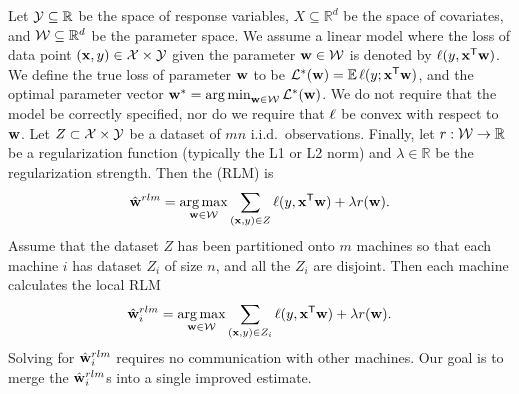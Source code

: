 \documentclass[thesis.tex]{subfiles}
\begin{document}
\vspace{-0.05in}
Let ${\mathcal Y}\subseteq\mathbb{R}$ be the space of response variables,
$X\subseteq\mathbb{R}^d$ be the space of covariates,
and ${\mathcal W}\subseteq\mathbb{R}^d$ be the parameter space.
We assume a linear model where the loss of data point $(\mathbf{x},y)\in{\mathcal X}\times{\mathcal Y}$ given the parameter $\mathbf w\in{\mathcal W}$ is denoted by $\ell(y,{\mathbf{x}}^{\mathsf{T}}\mathbf w)$.
We define the true loss of parameter $\mathbf w$ to be $\mathcal{L}^*(\mathbf w) = \operatorname*{\mathbb E}\ell(y;{\mathbf{x}}^{\mathsf{T}}\mathbf w)$, 
and the optimal parameter vector ${\mathbf w^{*}}=\operatorname*{arg\,min}_{\mathbf w\in{\mathcal W}}\mathcal{L}^*(\mathbf w)$.
We do not require that the model be correctly specified,
nor do we require that $\ell$ be convex with respect to $\mathbf w$.
Let $Z\subset{\mathcal X}\times{\mathcal Y}$ be a dataset of $mn$ i.i.d.\ observations.
Finally, let $r : {\mathcal W} \to \mathbb{R}$ be a regularization function (typically the L1 or L2 norm)
and $\lambda\in\mathbb{R}$ be the regularization strength.
Then the  (RLM) is
\begin{equation}
\label{eq:wrlm}
\hat{\mathbf w}^{rlm}=\operatorname*{arg\,max}_{\mathbf w\in{\mathcal W}} \sum_{(\mathbf{x},y)\in Z} \ell(y,{\mathbf{x}}^{\mathsf{T}}\mathbf w)
+ \lambda r(\mathbf w)
.
\end{equation}
%
Assume that the dataset $Z$ has been partitioned onto $m$ machines so that each machine $i$ has dataset $Z_i$ of size $n$, and all the $Z_i$ are disjoint.
Then each machine calculates the local RLM
\begin{equation}
\label{eq:wrlmi}
\hat{\mathbf w}^{rlm}_i = \operatorname*{arg\,max}_{\mathbf w\in{\mathcal W}} \sum_{(\mathbf{x},y) \in Z_i} \ell(y,{\mathbf{x}}^{\mathsf{T}}\mathbf w)
+ \lambda r(\mathbf w)
.
\end{equation}
Solving for $\hat{\mathbf w}^{rlm}_i$ requires no communication with other machines.
Our goal is to merge the $\hat{\mathbf w}^{rlm}_i$s into a single improved estimate.
\end{document}
